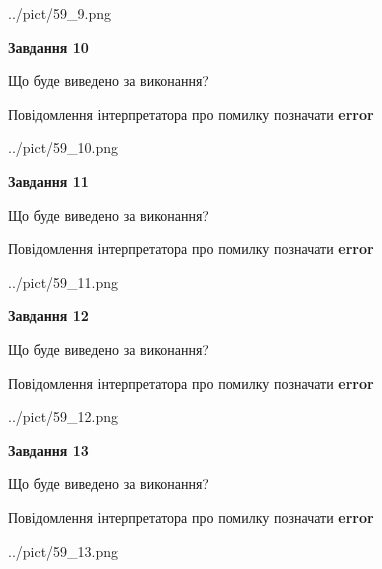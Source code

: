 \documentclass[11pt, ukrainian]{article}
\begin{document}
{\begin {large}
\begin{center}
	{../pict/59_9.png}
\end{center}
\newpage

{\begin {center}\textbf{Завдання 10}\end {center}}\par
Що буде виведено за виконання? \par
Повідомлення інтерпретатора про помилку позначати \textbf{error}

\begin{center}
	{../pict/59_10.png}
\end{center}
\newpage

{\begin {center}\textbf{Завдання 11}\end {center}}\par
Що буде виведено за виконання? \par
Повідомлення інтерпретатора про помилку позначати \textbf{error}

\begin{center}
	{../pict/59_11.png}
\end{center}
\newpage

{\begin {center}\textbf{Завдання 12}\end {center}}\par
Що буде виведено за виконання? \par
Повідомлення інтерпретатора про помилку позначати \textbf{error}

\begin{center}
	{../pict/59_12.png}
\end{center}
\newpage

{\begin {center}\textbf{Завдання 13}\end {center}}\par
Що буде виведено за виконання? \par
Повідомлення інтерпретатора про помилку позначати \textbf{error}

\begin{center}
	{../pict/59_13.png}
\end{center}
\newpage


\end{large}}
\end{document}
